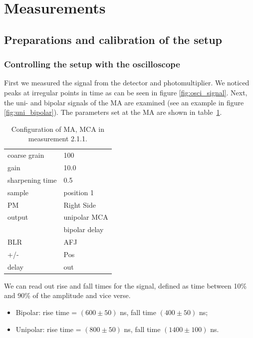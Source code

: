\section{Measurements}
\label{sec:measurements}

\subsection{Preparations and calibration of the setup}
\label{sub:preparations_and_calibration_of_the_setup}
\subsubsection{Controlling the setup with the oscilloscope}
\label{ssub:Controlling the setup with the oscilloscope}
First we measured the signal from the detector and photomultiplier. We noticed peaks at irregular points in time 
as can be seen in figure \ref{fig:osci_signal}. Next, the uni- and bipolar signals of the MA are 
examined (see an example in figure \ref{fig:uni_bipolar}). 
The parameters set at the MA are shown in table~\ref{tab:config}. 
\begin{table}[H]
    \centering
    \begin{tabular}{|l|l|}
     \hline
    coarse grain & 100\\
    gain    &   10.0 \\
    sharpening time &   0.5 \\
    sample & position 1\\
    PM & Right Side\\
    output & unipolar MCA\\
           & bipolar delay\\
     BLR & AFJ \\
     +/- & Pos \\
     delay & out\\
     \hline
    \end{tabular}
    \label{tab:config}
    \caption{
        Configuration of MA, MCA in measurement 2.1.1.
        }
\end{table}
We can read out rise and fall times for the signal, 
defined as time between 10\% and 90\% of the amplitude and vice verse. 
\begin{itemize}
    \item
        Bipolar:    rise time = $(600 \pm 50)$ ns, fall time $(400 \pm 50)$ ns;
    \item
        Unipolar:   rise time = $(800 \pm 50)$ ns, fall time $(1400 \pm 100)$ ns.
\end{itemize}
